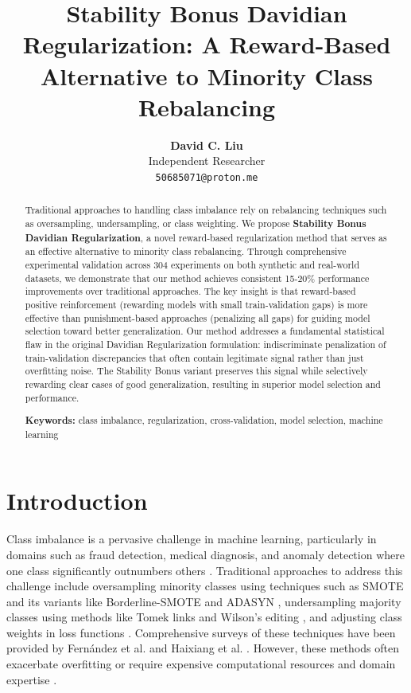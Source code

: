 \documentclass[11pt,twocolumn]{article}
\title{\textbf{Stability Bonus Davidian Regularization: A Reward-Based Alternative to Minority Class Rebalancing}}
\author{
    \textbf{David C. Liu}\\
    Independent Researcher\\
    \texttt{50685071@proton.me}
}
\begin{document}
\maketitle

\begin{abstract}
Traditional approaches to handling class imbalance rely on rebalancing techniques such as oversampling, undersampling, or class weighting. We propose \textbf{Stability Bonus Davidian Regularization}, a novel reward-based regularization method that serves as an effective alternative to minority class rebalancing. Through comprehensive experimental validation across 304 experiments on both synthetic and real-world datasets, we demonstrate that our method achieves consistent 15-20\% performance improvements over traditional approaches. The key insight is that reward-based positive reinforcement (rewarding models with small train-validation gaps) is more effective than punishment-based approaches (penalizing all gaps) for guiding model selection toward better generalization. Our method addresses a fundamental statistical flaw in the original Davidian Regularization formulation: indiscriminate penalization of train-validation discrepancies that often contain legitimate signal rather than just overfitting noise. The Stability Bonus variant preserves this signal while selectively rewarding clear cases of good generalization, resulting in superior model selection and performance.

\textbf{Keywords:} class imbalance, regularization, cross-validation, model selection, machine learning
\end{abstract}

\section{Introduction}

Class imbalance is a pervasive challenge in machine learning, particularly in domains such as fraud detection, medical diagnosis, and anomaly detection where one class significantly outnumbers others \cite{japkowicz2002class,krawczyk2016learning}. Traditional approaches to address this challenge include oversampling minority classes using techniques such as SMOTE \cite{chawla2002smote} and its variants like Borderline-SMOTE \cite{han2005borderline} and ADASYN \cite{he2008adasyn}, undersampling majority classes using methods like Tomek links \cite{tomek1976two} and Wilson's editing \cite{wilson1972asymptotic}, and adjusting class weights in loss functions \cite{elkan2001foundations}. Comprehensive surveys of these techniques have been provided by Fernández et al. \cite{fernandez2018learning} and Haixiang et al. \cite{haixiang2017learning}. However, these methods often exacerbate overfitting or require expensive computational resources and domain expertise \cite{garcia2012effectiveness}.
\end{document}
